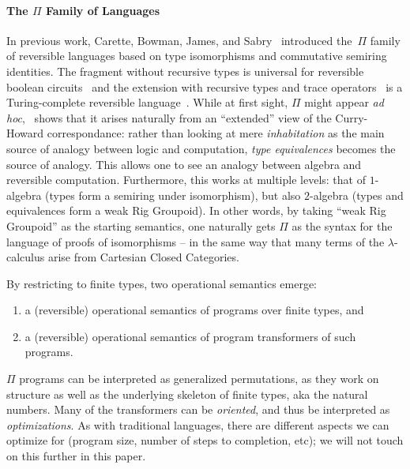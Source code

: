 \documentclass{entcs}
\begin{document}
\paragraph*{The $\Pi$ Family of Languages}
\noindent In previous work, Carette, Bowman, James, and
Sabry~\cite{rc2011,James:2012:IE:2103656.2103667,Carette2016} introduced
the~$\Pi$ family of reversible languages based on type isomorphisms and
commutative semiring identities. The fragment without recursive types is
universal for reversible boolean circuits~\cite{James:2012:IE:2103656.2103667}
and the extension with recursive types and trace
operators~\cite{Hasegawa:1997:RCS:645893.671607} is a Turing-complete reversible
language~\cite{James:2012:IE:2103656.2103667,rc2011}. While at first sight,
$\Pi$ might appear \emph{ad hoc},~\cite{Carette2016} shows that it arises
naturally from an ``extended'' view of the Curry-Howard correspondance: rather
than looking at mere \emph{inhabitation} as the main source of analogy between
logic and computation, \emph{type equivalences} becomes the source of analogy.
This allows one to see an analogy between algebra and reversible computation.
Furthermore, this works at multiple levels: that of $1$-algebra (types form a
semiring under isomorphism), but also $2$-algebra (types and equivalences form a
weak Rig Groupoid).  In other words, by taking ``weak Rig Groupoid'' as the
starting semantics, one naturally gets $\Pi$ as the syntax for the language of
proofs of isomorphisms -- in the same way that many terms of the
$\lambda$-calculus arise from Cartesian Closed Categories.

By restricting to finite types, two operational semantics emerge:
\begin{enumerate}
\item a (reversible) operational semantics of programs over finite types, and
\item a (reversible) operational semantics of program transformers of such programs.
\end{enumerate}
$\Pi$ programs can be interpreted as generalized permutations, as they work on
structure as well as the underlying skeleton of finite types, aka the natural numbers.
Many of the transformers can be \emph{oriented}, and thus be interpreted as
\emph{optimizations}.  As with traditional languages, there are different aspects
we can optimize for (program size, number of steps to completion, etc); we will
not touch on this further in this paper.

\newpage
\end{document}
